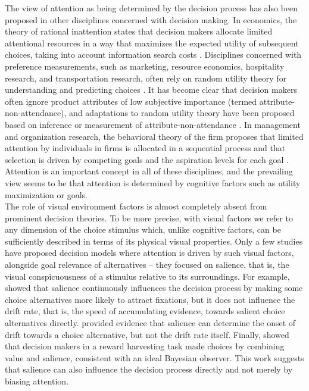 The view of attention as being determined by the decision process has also been proposed in other disciplines concerned with decision making. In economics, the theory of rational inattention states that decision makers allocate limited attentional resources in a way that maximizes the expected utility of subsequent choices, taking into account information search costs \citep{sims2003}. Disciplines concerned with preference measurements, such as marketing, resource economics, hospitality research, and transportation research, often rely on random utility theory for understanding and predicting choices \citep{louviere2000}. It has become clear that decision makers often ignore product attributes of low subjective importance (termed attribute-non-attendance), and adaptations to random utility theory have been proposed based on inference or measurement of attribute-non-attendance \citep{vanloo2018}. In management and organization research, the behavioral theory of the firm proposes that limited attention by individuals in firms is allocated in a sequential process and that selection is driven by competing goals and the aspiration levels for each goal \citep{ocasio2011}. Attention is an important concept in all of these disciplines, and the prevailing view seems to be that attention is determined by cognitive factors such as utility maximization or goals. \\

The role of visual environment factors is almost completely absent from prominent decision theories. To be more precise, with visual factors we refer to any dimension of the choice stimulus which, unlike cognitive factors, can be sufficiently described in terms of its physical visual properties. Only a few studies have proposed decision models where attention is driven by such visual factors, alongside goal relevance of alternatives -- they focused on salience, that is, the visual conspicuousness of a stimulus relative to its surroundings. For example, \cite{towal2013a} showed that salience continuously influences the decision process by making some choice alternatives more likely to attract fixations, but it does not influence the drift rate, that is, the speed of accumulating evidence, towards salient choice alternatives directly. \cite{chen2013} provided evidence that salience can determine the onset of drift towards a choice alternative, but not the drift rate itself. Finally, \cite{navalpakkam2010} showed that decision makers in a reward harvesting task made choices by combining value and salience, consistent with an ideal Bayesian observer. This work suggests that salience can also influence the decision process directly and not merely by biasing attention.\\ 

